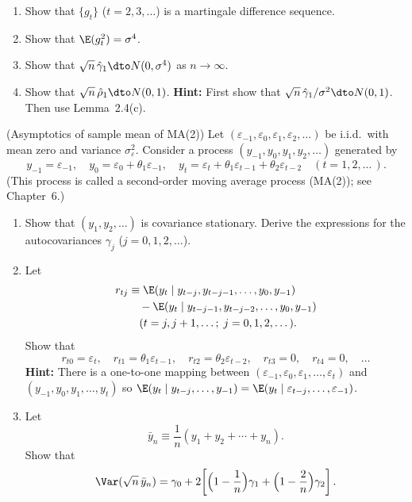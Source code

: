 \begin{problemset}
\begin{enumerate}[label=(\alph*)]
\item Show that $\{g_t\}$ ($t = 2, 3, \ldots$) is a martingale difference sequence.
\item Show that $\E(g_t^2) = \sigma^4$.
\item Show that $\sqrt{n}\,\hat{\gamma}_1 \dto N(0, \sigma^4)$ as $n \to \infty$.
\item Show that $\sqrt{n}\,\hat{\rho}_1 \dto N(0, 1)$.
\textbf{Hint:} First show that
$\sqrt{n}\,\hat{\gamma}_1/\sigma^2 \dto N(0, 1)$. Then use Lemma~2.4(c).
\end{enumerate}

\exercise[10] (Asymptotics of sample mean of MA(2))\quad
Let $(\varepsilon_{-1}, \varepsilon_0, \varepsilon_1, \varepsilon_2, \ldots)$ be i.i.d.\
with mean zero and variance $\sigma_\varepsilon^2$. Consider a process
$(y_{-1}, y_0, y_1, y_2, \ldots)$ generated by
\[
y_{-1} = \varepsilon_{-1}, \quad
y_0 = \varepsilon_0 + \theta_1\varepsilon_{-1}, \quad
y_t = \varepsilon_t + \theta_1\varepsilon_{t-1} + \theta_2\varepsilon_{t-2}
\quad (t = 1, 2, \ldots\,).
\]
(This process is called a second-order moving average process (MA(2)); see
Chapter~6.)
\begin{enumerate}[label=(\alph*)]
\item Show that $(y_1, y_2, \ldots)$ is covariance stationary. Derive the expressions for
the autocovariances $\gamma_j$ ($j = 0, 1, 2, \ldots$).

\item Let
\begin{align*}
r_{tj} &\equiv \E(y_t \mid y_{t-j}, y_{t-j-1}, \ldots, y_0, y_{-1}) \\
&\quad - \E(y_t \mid y_{t-j-1}, y_{t-j-2}, \ldots, y_0, y_{-1}) \\
&\quad (t = j, j+1, \ldots;\; j = 0, 1, 2, \ldots\,).
\end{align*}
Show that
\[
r_{t0} = \varepsilon_t, \quad
r_{t1} = \theta_1\varepsilon_{t-1}, \quad
r_{t2} = \theta_2\varepsilon_{t-2}, \quad
r_{t3} = 0, \quad
r_{t4} = 0, \quad \ldots
\]
\textbf{Hint:} There is a one-to-one mapping between
$(\varepsilon_{-1}, \varepsilon_0, \varepsilon_1, \ldots, \varepsilon_t)$ and
$(y_{-1}, y_0, y_1, \ldots, y_t)$ so
$\E(y_t \mid y_{t-j}, \ldots, y_{-1}) = \E(y_t \mid \varepsilon_{t-j}, \ldots, \varepsilon_{-1})$.

\item Let
\[
\bar{y}_n \equiv \frac{1}{n}(y_1 + y_2 + \cdots + y_n).
\]
Show that
\[
\Var(\sqrt{n}\,\bar{y}_n) = \gamma_0
+ 2\!\left[\Bigl(1 - \frac{1}{n}\Bigr)\gamma_1
+ \Bigl(1 - \frac{2}{n}\Bigr)\gamma_2\right].
\]


\end{enumerate}
\end{problemset}
